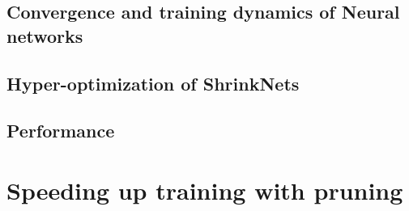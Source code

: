 \begin{figure}
\begin{center}
\end{center}
\vspace*{-4mm}
\end{figure}

\subsection{Convergence and training dynamics of Neural networks}

\subsection{Hyper-optimization of ShrinkNets}

\subsection{Performance}

\section{Speeding up training with pruning}